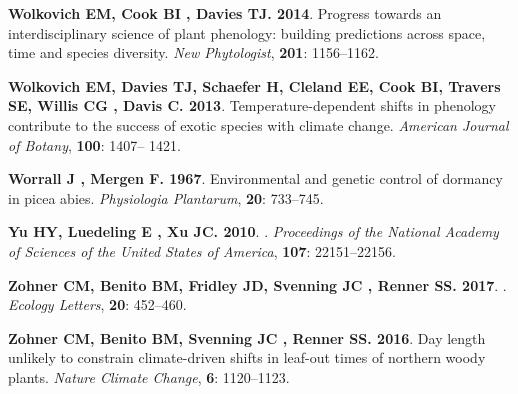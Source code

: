\documentclass[11pt]{article}
\begin{document}
\begin{thebibliography}{69}
{\bf Wolkovich EM, Cook BI , Davies TJ}{\bf . 2014}.
\newblock Progress towards an interdisciplinary science of plant phenology:
  building predictions across space, time and species diversity.
\newblock \emph{New Phytologist}, {\bf 201}: 1156--1162.

{\bf Wolkovich EM, Davies TJ, Schaefer H, Cleland EE, Cook BI, Travers SE,
  Willis CG , Davis C}{\bf . 2013}.
\newblock Temperature-dependent shifts in phenology contribute to the success
  of exotic species with climate change.
\newblock \emph{American Journal of Botany}, {\bf 100}: 1407-- 1421.

{\bf Worrall J , Mergen F}{\bf . 1967}.
\newblock Environmental and genetic control of dormancy in picea abies.
\newblock \emph{Physiologia Plantarum}, {\bf 20}: 733--745.

{\bf Yu HY, Luedeling E , Xu JC}{\bf . 2010}.
.
\newblock \emph{Proceedings of the National Academy of Sciences of the United
  States of America}, {\bf 107}: 22151--22156.

{\bf Zohner CM, Benito BM, Fridley JD, Svenning JC , Renner SS}{\bf . 2017}.
.
\newblock \emph{Ecology Letters}, {\bf 20}: 452--460.

{\bf Zohner CM, Benito BM, Svenning JC , Renner SS}{\bf . 2016}.
\newblock Day length unlikely to constrain climate-driven shifts in leaf-out
  times of northern woody plants.
\newblock \emph{Nature Climate Change}, {\bf 6}: 1120--1123.

\end{thebibliography}
\end{document}
